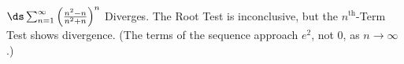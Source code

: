 {$\ds\sum_{n=1}^\infty \left(\frac{n^2-n}{n^2+n}\right)^n$
}
{Diverges. The Root Test is inconclusive, but the $n^\text{th}$-Term Test shows divergence. (The terms of the sequence approach $e^2$, not 0, as $n\to\infty$.)
}
